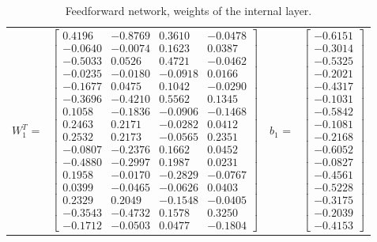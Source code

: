 \documentclass[algorithms,article,submit,pdftex,moreauthors]{Definitions/mdpi}
\begin{document}
\begin{table}[ht]
	\centering
	\caption{Feedforward network, weights of the internal layer.}
	\label{tab:matW1b1}
	
	\begin{tabular}{rlrl}  
		$W_1^T$ = & 
		$
	\begin{bmatrix}
	0.4196 & -0.8769 &  0.3610 & -0.0478 \\
	-0.0640 & -0.0074 &  0.1623 &  0.0387 \\
	-0.5033 &  0.0526 &  0.4721 & -0.0462 \\
	-0.0235 & -0.0180 & -0.0918 &  0.0166 \\
	-0.1677 &  0.0475 &  0.1042 & -0.0290 \\
	-0.3696 & -0.4210 &  0.5562 &  0.1345 \\
	0.1058 & -0.1836 & -0.0906 & -0.1468 \\
	0.2463 &  0.2171 & -0.0282 &  0.0412 \\
	0.2532 &  0.2173 & -0.0565 &  0.2351 \\
	-0.0807 & -0.2376 &  0.1662 &  0.0452 \\
	-0.4880 & -0.2997 &  0.1987 &  0.0231 \\
	0.1958 & -0.0170 & -0.2829 & -0.0767 \\
	0.0399 & -0.0465 & -0.0626 &  0.0403 \\
	0.2329 &  0.2049 & -0.1548 & -0.0405 \\
	-0.3543 & -0.4732 &  0.1578 &  0.3250 \\
	-0.1712 & -0.0503 &  0.0477 & -0.1804
\end{bmatrix}
		$
		&
		$b_1$ = &
		$
\begin{bmatrix}
	-0.6151 \\
	-0.3014 \\
	-0.5325 \\
	-0.2021 \\
	-0.4317 \\
	-0.1031 \\
	-0.5842 \\
	-0.1081 \\
	-0.2168 \\
	-0.6052 \\
	-0.0827 \\
	-0.4561 \\
	-0.5228 \\
	-0.3175 \\
	-0.2039 \\
	-0.4153
\end{bmatrix}
		$
	\end{tabular}	
\end{table}
\end{document}
